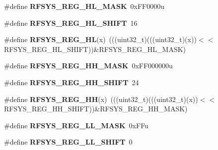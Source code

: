 \begin{DoxyCompactItemize}
\item 
\#define {\bfseries R\+F\+S\+Y\+S\+\_\+\+R\+E\+G\+\_\+\+H\+L\+\_\+\+M\+A\+SK}~0x\+F\+F0000u\hypertarget{group__RFSYS__Register__Masks_ga063f595b6c7267627c96048590611cc1}{}\label{group__RFSYS__Register__Masks_ga063f595b6c7267627c96048590611cc1}

\item 
\#define {\bfseries R\+F\+S\+Y\+S\+\_\+\+R\+E\+G\+\_\+\+H\+L\+\_\+\+S\+H\+I\+FT}~16\hypertarget{group__RFSYS__Register__Masks_gabc34a2d1963a697d1a773a8981a063f5}{}\label{group__RFSYS__Register__Masks_gabc34a2d1963a697d1a773a8981a063f5}

\item 
\#define {\bfseries R\+F\+S\+Y\+S\+\_\+\+R\+E\+G\+\_\+\+HL}(x)~(((uint32\+\_\+t)(((uint32\+\_\+t)(x))$<$$<$R\+F\+S\+Y\+S\+\_\+\+R\+E\+G\+\_\+\+H\+L\+\_\+\+S\+H\+I\+FT))\&R\+F\+S\+Y\+S\+\_\+\+R\+E\+G\+\_\+\+H\+L\+\_\+\+M\+A\+SK)\hypertarget{group__RFSYS__Register__Masks_gaea8beedf47675b6b2c630526a03d90e5}{}\label{group__RFSYS__Register__Masks_gaea8beedf47675b6b2c630526a03d90e5}

\item 
\#define {\bfseries R\+F\+S\+Y\+S\+\_\+\+R\+E\+G\+\_\+\+H\+H\+\_\+\+M\+A\+SK}~0x\+F\+F000000u\hypertarget{group__RFSYS__Register__Masks_gae1fb55483b3d79a2e74d0c1ad4e57d51}{}\label{group__RFSYS__Register__Masks_gae1fb55483b3d79a2e74d0c1ad4e57d51}

\item 
\#define {\bfseries R\+F\+S\+Y\+S\+\_\+\+R\+E\+G\+\_\+\+H\+H\+\_\+\+S\+H\+I\+FT}~24\hypertarget{group__RFSYS__Register__Masks_gae78b067bd28db1d0ff57015f300312fb}{}\label{group__RFSYS__Register__Masks_gae78b067bd28db1d0ff57015f300312fb}

\item 
\#define {\bfseries R\+F\+S\+Y\+S\+\_\+\+R\+E\+G\+\_\+\+HH}(x)~(((uint32\+\_\+t)(((uint32\+\_\+t)(x))$<$$<$R\+F\+S\+Y\+S\+\_\+\+R\+E\+G\+\_\+\+H\+H\+\_\+\+S\+H\+I\+FT))\&R\+F\+S\+Y\+S\+\_\+\+R\+E\+G\+\_\+\+H\+H\+\_\+\+M\+A\+SK)\hypertarget{group__RFSYS__Register__Masks_ga9724177c60594bb3a22f13e9ef7de07c}{}\label{group__RFSYS__Register__Masks_ga9724177c60594bb3a22f13e9ef7de07c}

\item 
\#define {\bfseries R\+F\+S\+Y\+S\+\_\+\+R\+E\+G\+\_\+\+L\+L\+\_\+\+M\+A\+SK}~0x\+F\+Fu\hypertarget{group__RFSYS__Register__Masks_ga2fe64579aaef18ce266e3d6c316d3241}{}\label{group__RFSYS__Register__Masks_ga2fe64579aaef18ce266e3d6c316d3241}

\item 
\#define {\bfseries R\+F\+S\+Y\+S\+\_\+\+R\+E\+G\+\_\+\+L\+L\+\_\+\+S\+H\+I\+FT}~0\hypertarget{group__RFSYS__Register__Masks_gaab45c60c0a8e5edb59537ee2bcb2bbcf}{}\label{group__RFSYS__Register__Masks_gaab45c60c0a8e5edb59537ee2bcb2bbcf}


\end{DoxyCompactItemize}

